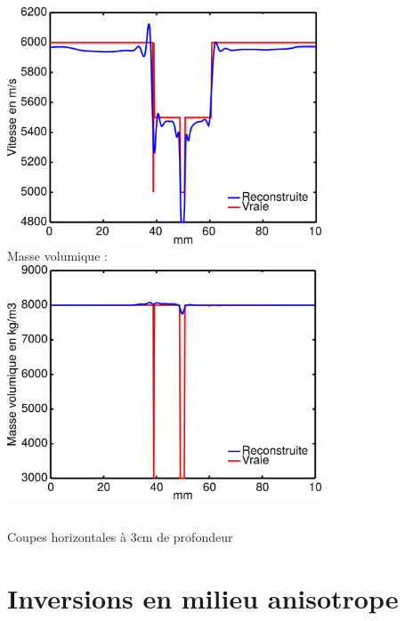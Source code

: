 \documentclass[10pt,xcolor=x11names,compress, notes=show]{beamer}%
\begin{document}
\begin{frame}
\begin{itemize}
\begin{columns}
		\includegraphics[width=0.7\textwidth]{img/multi/coupe_vp_multi.png}\\
		\centering
		Masse volumique : \\[0.2cm]
		\includegraphics[width=0.7\textwidth]{img/multi/coupe_rho_multi.png}\\
	\end{columns}
	
\end{itemize}
Coupes horizontales à 3cm de profondeur
\end{frame}

\section{Inversions en milieu anisotrope}
\end{document}
